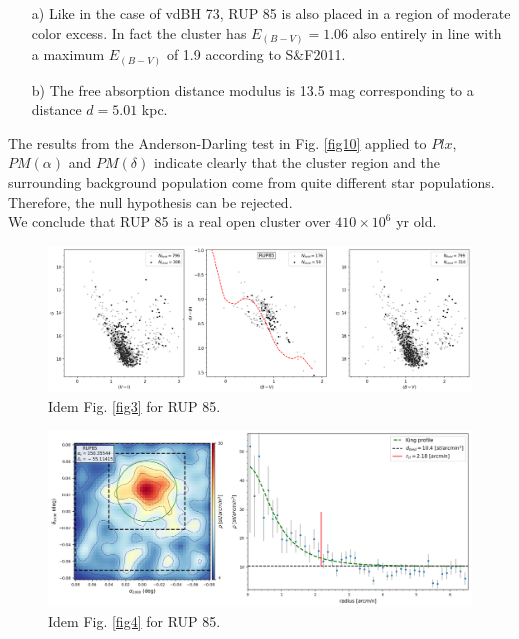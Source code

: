 \documentclass[draft]{aa}
\begin{document}
\begin{itemize}
\item [a)] Like in the case of vdBH 73, RUP 85 is also placed
    in a region of moderate color excess. In fact the cluster has $E_{(B-V)} =
    1.06$ also entirely in line with a maximum $E_{(B-V)}$ of 1.9 according to 
    S\&F2011.
\item [b)] The free absorption distance modulus is 13.5 mag corresponding to a
    distance $d=5.01$ kpc.
\end{itemize}

The results from the Anderson-Darling test in Fig. \ref{fig10} applied to $Plx$,
$PM(\alpha)$ and $PM(\delta)$ indicate clearly that the cluster region and the
surrounding background population come from quite different star populations.
Therefore, the null hypothesis can be rejected.\\

We conclude that RUP 85 is a real open cluster over $410\times10^6$ yr old.

\begin{figure}[ht]
    \centering
    \includegraphics[width=\hsize]{../figs/obs_RUP85.png}
    \caption{Idem Fig. \ref{fig3} for RUP 85.}
    \label{fig7}
\end{figure}

\begin{figure}[ht]
    \centering
    \includegraphics[width=\hsize]{../figs/dmap_rup85.png}
    \caption{Idem Fig. \ref{fig4} for RUP 85.}
    \label{fig8}
\end{figure}
\end{document}
